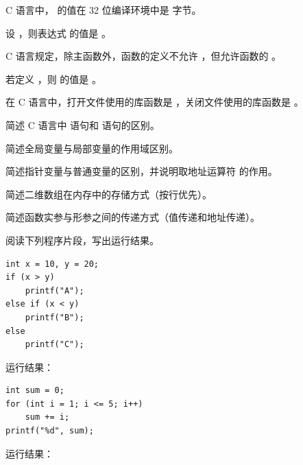 \documentclass[a4paper,11pt]{article}
\begin{document}
\examtitle


\anslines{0.1cm}

\q C 语言中， 的值在 32 位编译环境中是 \fillblank 字节。

\q 设 ，则表达式  的值是 \fillblank。

\q C 语言规定，除主函数外，函数的定义不允许 \fillblank ，但允许函数的 \fillblank 。

\q 若定义 ，则  的值是 \fillblank。

\q 在 C 语言中，打开文件使用的库函数是 \fillblank ，关闭文件使用的库函数是 \fillblank 。


\q 简述 C 语言中  语句和  语句的区别。
\anslines{1.5cm}

\q 简述全局变量与局部变量的作用域区别。
\anslines{1.5cm}

\q 简述指针变量与普通变量的区别，并说明取地址运算符 \code{\&} 的作用。
\anslines{1.5cm}

\q 简述二维数组在内存中的存储方式（按行优先）。
\anslines{1.5cm}

\q 简述函数实参与形参之间的传递方式（值传递和地址传递）。
\anslines{1.5cm}


阅读下列程序片段，写出运行结果。

\q
\begin{lstlisting}[language={[custom]C}]
int x = 10, y = 20;
if (x > y)
    printf("A");
else if (x < y)
    printf("B");
else
    printf("C");
\end{lstlisting}
运行结果：\underline{\hspace{3cm}}


\q
\begin{lstlisting}[language={[custom]C}]
int sum = 0;
for (int i = 1; i <= 5; i++)
    sum += i;
printf("%d", sum);
\end{lstlisting}
运行结果：\underline{\hspace{3cm}}
\end{document}
